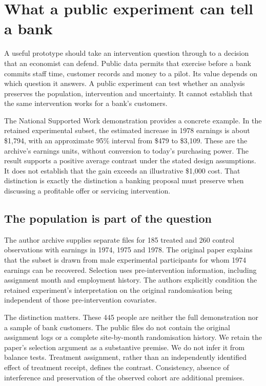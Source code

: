\chapter{What a public experiment can tell a bank}
\label{gap29:public}

A useful prototype should take an intervention question through to a decision
that an economist can defend. Public data permits that exercise before a bank
commits staff time, customer records and money to a pilot. Its value depends on
which question it answers. A public experiment can test whether an analysis
preserves the population, intervention and uncertainty. It cannot establish
that the same intervention works for a bank's customers.

The National Supported Work demonstration provides a concrete example. In the
retained experimental subset, the estimated increase in 1978 earnings is about
\$1,794, with an approximate 95\% interval from \$479 to \$3,109. These are
the archive's earnings units, without conversion to today's purchasing power.
The result supports a positive average contrast under the stated design
assumptions. It does not establish that the gain exceeds an illustrative
\$1,000 cost. That distinction is exactly the distinction a banking proposal
must preserve when discussing a profitable offer or servicing intervention.

\section{The population is part of the question}
The author archive supplies separate files for 185 treated and 260 control
observations with earnings in 1974, 1975 and 1978. The original paper explains
that the subset is drawn from male experimental participants for whom 1974
earnings can be recovered. Selection uses pre-intervention information,
including assignment month and employment history. The authors explicitly
condition the retained experiment's interpretation on the original
randomisation being independent of those pre-intervention covariates.
\citep{gap29dehejia,gap29data}

The distinction matters. These 445 people are neither the full demonstration
nor a sample of bank customers. The public files do not contain the original
assignment logs or a complete site-by-month randomisation history. We retain
the paper's selection argument as a substantive premise. We do not infer it
from balance tests. Treatment assignment, rather than an independently
identified effect of treatment receipt, defines the contrast. Consistency,
absence of interference and preservation of the observed cohort are additional
premises.

